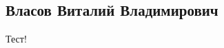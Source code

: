 \documentclass[a4paper,12pt]{report}
\begin{document}
	\def \nocredits {}
	\def \LineE {Конспект по дисциплине}
	\def \LineF {WEB-технология}

	\maketitle




\subsection*{Власов Виталий Владимирович}




	Тест!



\end{document}
